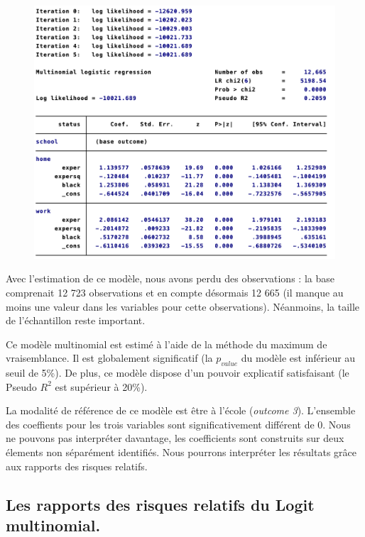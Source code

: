 \begin{figure}[h]
    \includegraphics[scale = 0.55]{100_tab_results/mlogit.png}
    \centering
\end{figure}

Avec l’estimation de ce modèle, nous avons perdu des observations : la base comprenait 12 723 observations et en compte désormais 12 665 (il manque au moins une valeur dans les variables pour cette observations). Néanmoins, la taille de l’échantillon reste important. 

\vspace*{0.3cm}

Ce modèle multinomial est estimé à l’aide de la méthode du maximum de vraisemblance. Il est globalement significatif (la $p_{value}$ du modèle est inférieur au seuil de 5\%). De plus, ce modèle dispose d’un pouvoir explicatif satisfaisant (le Pseudo $R^2$ est supérieur à 20\%).

\vspace*{0.3cm}

La modalité de référence de ce modèle est être à l’école (\emph{outcome 3}). L’ensemble des coeffients pour les trois variables sont significativement différent de 0. Nous ne pouvons pas interpréter davantage, les coefficients sont construits sur deux élements non séparément identifiés. Nous pourrons interpréter les résultats grâce aux rapports des risques relatifs. 

\subsection{Les rapports des risques relatifs du Logit multinomial.}

